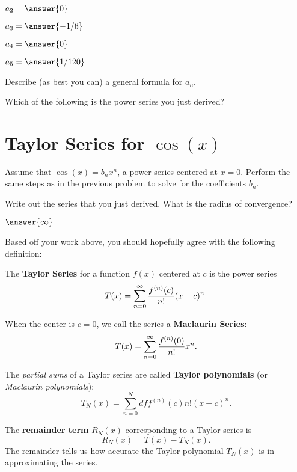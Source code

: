 \documentclass{ximera}
\newcommand{\dsum}{\displaystyle \sum}
\newcommand{\dseries}{\dsum_{n=0}^{\infty}}
\begin{document}
$a_2 = \answer{0}$

$a_3 = \answer{-1/6}$

$a_4 = \answer{0}$

$a_5 = \answer{1/120}$

Describe (as best you can) a general formula for $a_n$.

\begin{freeResponse}

\end{freeResponse}


Which of the following is the power series you just derived?
\begin{multipleChoice}
	\choice[correct]{$\dseries x - \frac{x^3}{3!} + \frac{x^5}{5!} - \frac{x^7}{7!} + \dots $}
\end{multipleChoice}

\section{Taylor Series for $\cos(x)$}

Assume that $\cos(x) = b_n x^n$, a power series centered at $x=0$. Perform the same steps as in the previous problem to solve for the coefficients $b_n$.

Write out the series that you just derived. What is the radius of convergence?

$\answer{\infty}$

Based off your work above, you should hopefully agree with the following definition:

\begin{definition}
The \textbf{Taylor Series} for a function $f(x)$ centered at $c$ is the power series
		\[
			T(x) = \dseries \df{f^{(n)}(c)}{n!}(x-c)^n.
		\]
	
	When the center is $c=0$, we call the series a \textbf{Maclaurin Series}:
		\[
			T(x) = \dseries \df{f^{(n)}(0)}{n!}x^n.
		\]	
		
\end{definition}
\begin{definition}
The \emph{partial sums} of a Taylor series are called \textbf{Taylor polynomials} (or \emph{Maclaurin polynomials}):
		\[
			T_N(x) = \sum_{n=0}^N df{f^{(n)}(c)}{n!}(x-c)^n.
		\]
	
    \end{definition}
    \begin{definition}
The \textbf{remainder term} $R_N(x)$ corresponding to a Taylor series is
		\[
			R_N(x) = T(x) - T_N(x).
		\]
	The remainder tells us how accurate the Taylor polynomial $T_N(x)$ is in approximating the series.
\end{definition}
\end{document}
